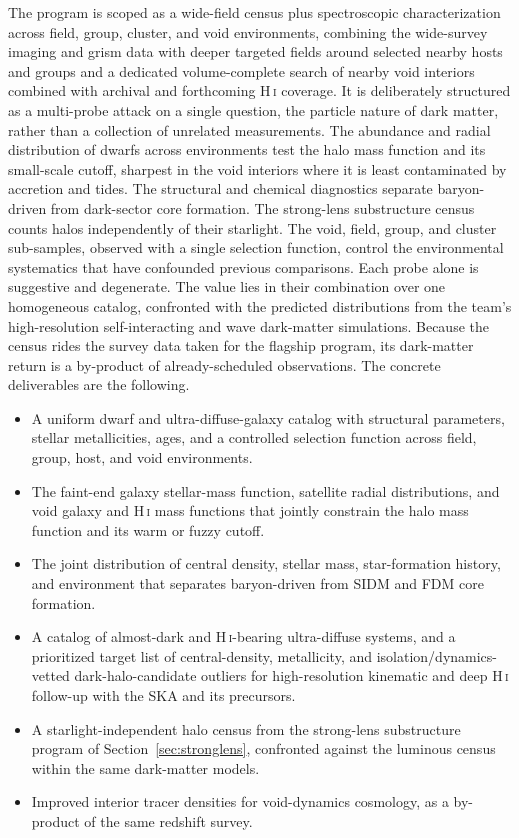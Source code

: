 \documentclass[10pt,onecolumn]{article}
\begin{document}
The program is scoped as a wide-field census plus spectroscopic characterization across field, group, cluster, and void environments, combining the wide-survey imaging and grism data with deeper targeted fields around selected nearby hosts and groups and a dedicated volume-complete search of nearby void interiors combined with archival and forthcoming H\,\textsc{i} coverage. It is deliberately structured as a multi-probe attack on a single question, the particle nature of dark matter, rather than a collection of unrelated measurements. The abundance and radial distribution of dwarfs across environments test the halo mass function and its small-scale cutoff, sharpest in the void interiors where it is least contaminated by accretion and tides. The structural and chemical diagnostics separate baryon-driven from dark-sector core formation. The strong-lens substructure census counts halos independently of their starlight. The void, field, group, and cluster sub-samples, observed with a single selection function, control the environmental systematics that have confounded previous comparisons. Each probe alone is suggestive and degenerate. The value lies in their combination over one homogeneous catalog, confronted with the predicted distributions from the team's high-resolution self-interacting and wave dark-matter simulations. Because the census rides the survey data taken for the flagship program, its dark-matter return is a by-product of already-scheduled observations. The concrete deliverables are the following.
\begin{itemize}[leftmargin=1.4em,itemsep=1pt,topsep=2pt]
\item A uniform dwarf and ultra-diffuse-galaxy catalog with structural parameters, stellar metallicities, ages, and a controlled selection function across field, group, host, and void environments.
\item The faint-end galaxy stellar-mass function, satellite radial distributions, and void galaxy and H\,\textsc{i} mass functions that jointly constrain the halo mass function and its warm or fuzzy cutoff.
\item The joint distribution of central density, stellar mass, star-formation history, and environment that separates baryon-driven from SIDM and FDM core formation.
\item A catalog of almost-dark and H\,\textsc{i}-bearing ultra-diffuse systems, and a prioritized target list of central-density, metallicity, and isolation/dynamics-vetted dark-halo-candidate outliers for high-resolution kinematic and deep H\,\textsc{i} follow-up with the SKA and its precursors.
\item A starlight-independent halo census from the strong-lens substructure program of Section~\ref{sec:stronglens}, confronted against the luminous census within the same dark-matter models.
\item Improved interior tracer densities for void-dynamics cosmology, as a by-product of the same redshift survey.
\end{itemize}
\end{document}
